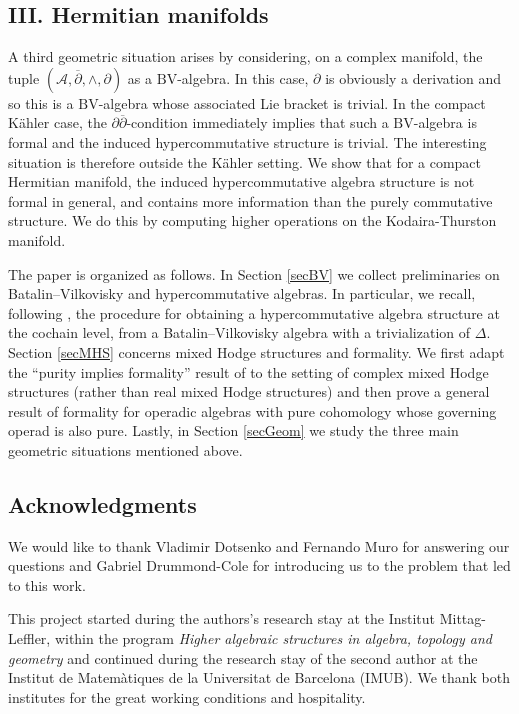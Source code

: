 \documentclass[a4paper]{amsart}
\theoremstyle{definition}
\theoremstyle{theorem}
\newcommand{\Aa}{\mathcal{A}}
\newcommand{\del}{\partial}
\newcommand{\delb}{{\overline\partial}}
\newcommand{\BV}{{\mathrm{BV}}}
\begin{document}
\subsection*{III. Hermitian manifolds}
A third geometric situation arises by considering, on a complex manifold, the tuple $(\Aa,\delb,\wedge,\del)$ as a $\BV$-algebra. In this case, $\del$ is obviously a derivation and so this is a $\BV$-algebra whose associated Lie bracket is trivial.
In the compact Kähler case, the $\del\delb$-condition immediately implies that such a $\BV$-algebra is formal and the induced hypercommutative structure is trivial. The interesting situation is therefore outside the Kähler setting. We show that for a compact Hermitian manifold, the induced hypercommutative algebra structure is not formal in general, and contains more information than the purely commutative structure. We do this by computing higher operations on the Kodaira-Thurston manifold.



\medskip 

The paper is organized as follows. In Section \ref{secBV} we collect preliminaries on Batalin--Vilkovisky and hypercommutative algebras. In particular, we recall, following \cite{KMS}, the procedure for obtaining a hypercommutative algebra structure at the cochain level, from a Batalin--Vilkovisky algebra with a trivialization of $\Delta$. Section \ref{secMHS} concerns mixed Hodge structures and formality. We first adapt the ``purity implies formality'' result of \cite{CiHo} to the setting of complex mixed Hodge structures (rather than real mixed Hodge structures) and then prove a general result of formality for operadic algebras with pure cohomology whose governing operad is also pure.
Lastly, in Section \ref{secGeom} we study the three main geometric situations mentioned above.








\subsection*{Acknowledgments}
We would like to thank Vladimir Dotsenko and Fernando Muro for answering our questions and Gabriel Drummond-Cole for introducing us to the problem that led to this work.

This project started during the authors's research stay at the Institut Mittag-Leffler, within the program 
\textit{Higher algebraic structures in algebra, topology and geometry} and continued during the research stay of the second author at the Institut de Matemàtiques de la Universitat de Barcelona (IMUB). We thank both institutes for the great working conditions and hospitality.
\end{document}
